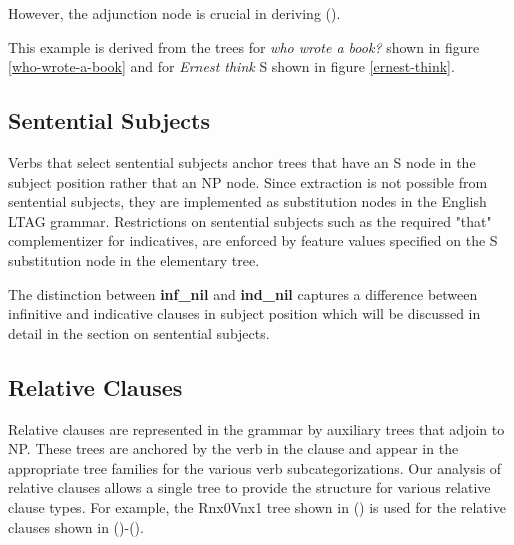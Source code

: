

However, the adjunction node is crucial in deriving ().  


This example is derived from the trees for {\it who wrote a book?} shown
in figure \ref{who-wrote-a-book} and for {\it Ernest think} S shown in
figure \ref{ernest-think}.

\subsection{Sentential Subjects}

Verbs that select sentential subjects anchor trees that have an S node
in the subject position rather that an NP node.  Since extraction is
not possible from sentential subjects, they are implemented as
substitution nodes in the English LTAG grammar.  Restrictions on
sentential subjects such as the required "that" complementizer for
indicatives, are enforced by feature values specified on the S
substitution node in the elementary tree.  

The distinction between {\bf inf\_nil} and {\bf ind\_nil} captures a
difference between infinitive and indicative clauses in subject
position which will be discussed in detail in the section on
sentential subjects.

\subsection{Relative Clauses}
Relative clauses are represented in the grammar by auxiliary trees
that adjoin to NP. These trees are anchored by the verb in the clause
and appear in the appropriate tree families for the various verb
subcategorizations. Our analysis of relative clauses allows a single
tree to provide the structure for various relative clause types. For
example, the Rnx0Vnx1 tree shown in () is used for the relative
clauses shown in ()-().



